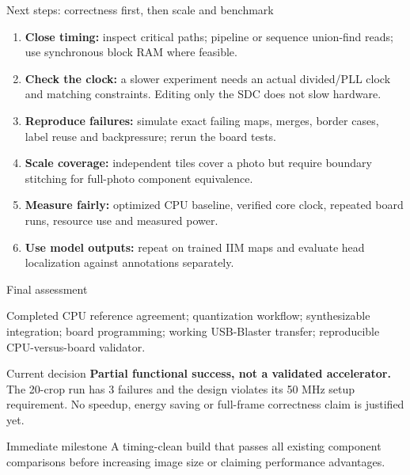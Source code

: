\documentclass[aspectratio=169,10pt]{beamer}
\begin{document}
\begin{frame}{Next steps: correctness first, then scale and benchmark}
\begin{enumerate}
\item \textbf{Close timing:} inspect critical paths; pipeline or sequence union-find reads; use synchronous block RAM where feasible.
\item \textbf{Check the clock:} a slower experiment needs an actual divided/PLL clock and matching constraints. Editing only the SDC does not slow hardware.
\item \textbf{Reproduce failures:} simulate exact failing maps, merges, border cases, label reuse and backpressure; rerun the board tests.
\item \textbf{Scale coverage:} independent tiles cover a photo but require boundary stitching for full-photo component equivalence.
\item \textbf{Measure fairly:} optimized CPU baseline, verified core clock, repeated board runs, resource use and measured power.
\item \textbf{Use model outputs:} repeat on trained IIM maps and evaluate head localization against annotations separately.
\end{enumerate}
\end{frame}

\begin{frame}{Final assessment}
\begin{block}{Completed}
CPU reference agreement; quantization workflow; synthesizable integration; board programming; working USB-Blaster transfer; reproducible CPU-versus-board validator.
\end{block}
\begin{alertblock}{Current decision}
\textbf{Partial functional success, not a validated accelerator.} The 20-crop run has 3 failures and the design violates its 50 MHz setup requirement. No speedup, energy saving or full-frame correctness claim is justified yet.
\end{alertblock}
\begin{block}{Immediate milestone}
A timing-clean build that passes all existing component comparisons before increasing image size or claiming performance advantages.
\end{block}
\end{frame}
\end{document}
